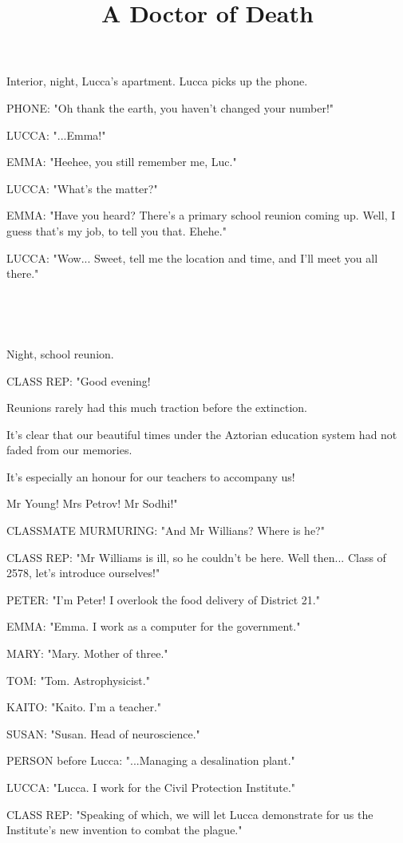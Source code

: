 \documentclass[11pt]{article}
\begin{document}
\ttfamily
\title{A Doctor of Death}
\maketitle

Interior, night, Lucca's apartment.
Lucca picks up the phone. 

PHONE: "Oh thank the earth, you haven't changed your number!"

LUCCA: "...Emma!"

EMMA: "Heehee, you still remember me, Luc."

LUCCA: "What's the matter?"

EMMA: "Have you heard? 
There's a primary school reunion coming up.
Well, I guess that's my job, to tell you that. 
Ehehe."

LUCCA: "Wow... Sweet, tell me the location and time, and I'll meet you all there."

\ 

\ 

Night, school reunion.

CLASS REP: "Good evening!

Reunions rarely had this much traction before the extinction.

It's clear that our beautiful times under the Aztorian education system had not faded from our memories.

It's especially an honour for our teachers to accompany us!

Mr Young!
Mrs Petrov!
Mr Sodhi!"

CLASSMATE MURMURING: "And Mr Willians? Where is he?"

CLASS REP: "Mr Williams is ill, so he couldn't be here. Well then...
Class of 2578, let's introduce ourselves!"

PETER: "I'm Peter! I overlook the food delivery of District 21."

EMMA: "Emma. I work as a computer for the government."

MARY: "Mary. Mother of three."

TOM: "Tom. Astrophysicist."

KAITO: "Kaito. I'm a teacher."

SUSAN: "Susan. Head of neuroscience."

PERSON before Lucca: "...Managing a desalination plant."

LUCCA: "Lucca. I work for the Civil Protection Institute."

CLASS REP: "Speaking of which, we will let Lucca demonstrate for us the Institute's new invention to combat the plague."
\end{document}
